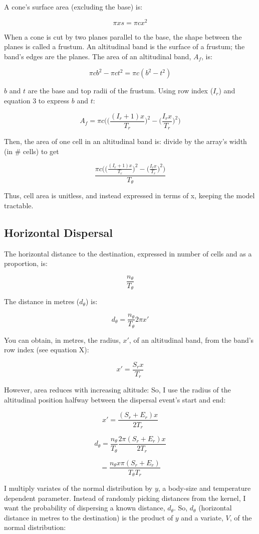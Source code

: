 \documentclass[11pt]{article}
\begin{document}
A cone's surface area (excluding the base) is:

$$\pi xs = \pi cx^2$$

When a cone is cut by two planes parallel to the base, the shape between the planes is called a frustum. An altitudinal band is the surface of a frustum; the band's edges are the planes. The area of an altitudinal band, $A_f$, is:

$$\pi c b^2 - \pi c t^2 = \pi c(b^2 - t^2)$$

$b$ and $t$ are the base and top radii of the frustum. Using row index ($I_r$) and equation 3 to express $b$ and $t$:

$$A_f = \pi c \bigg(\Big(\frac{(I_r + 1)x}{T_r}\Big)^2 - \Big(\frac{I_r x}{T_r}\Big)^2 \bigg)$$

Then, the area of one cell in an altitudinal band is:  
divide by the array's width (in \# cells) to get

$$\frac{\pi c \bigg(\Big(\frac{(I_r + 1)x}{T_r}\Big)^2 - \Big(\frac{I_r x}{T_r}\Big)^2 \bigg)}{T_\theta}$$

Thus, cell area is unitless, and instead expressed in terms of x, keeping the model tractable.

\subsection*{Horizontal Dispersal}
The horizontal distance to the destination, expressed in number of cells and as a proportion, is:

$$\frac{n_\theta}{T_\theta}$$

The distance in metres ($d_\theta$) is:

$$d_\theta = \frac{n_\theta}{T_\theta} 2\pi x'$$

You can obtain, in metres, the radius, $x'$, of an altitudinal band, from the band's row index (see equation X):

$$x' = \frac{S_r x}{T_r}$$

However, area reduces with increasing altitude: So, I use the radius of the altitudinal position halfway between the dispersal event's start and end:

$$x' = \frac{(S_r + E_r)x}{2T_r}$$

$$d_\theta = \frac{n_\theta}{T_\theta} \frac{2\pi (S_r + E_r)x}{2T_r}$$

$$= \frac{n_\theta x \pi (S_r + E_r)}{T_\theta T_r}$$

I multiply variates of the normal distribution by $y$, a body-size and temperature dependent parameter. Instead of randomly picking distances from the kernel, I want the probability of dispersing a known distance, $d_\theta$. So, $d_\theta$ (horizontal distance in metres to the destination) is the product of $y$ and a variate, $V$, of the normal distribution:
\end{document}
